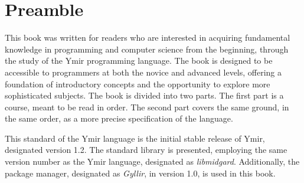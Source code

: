 \chapter*{Preamble}
\label{chap:preamble}

This book was written for readers who are interested in acquiring fundamental
knowledge in programming and computer science from the beginning, through the
study of the Ymir programming language. The book is designed to be accessible to
programmers at both the novice and advanced levels, offering a foundation of
introductory concepts and the opportunity to explore more sophisticated
subjects. The book is divided into two parts. The first part is a course, meant
to be read in order. The second part covers the same ground, in the same order,
as a more precise specification of the language.

This standard of the Ymir language is the initial stable release of Ymir,
designated version 1.2. The standard library is presented, employing the same
version number as the Ymir language, designated as \textit{libmidgard}.
Additionally, the package manager, designated as \textit{Gyllir}, in version
1.0, is used in this book.
